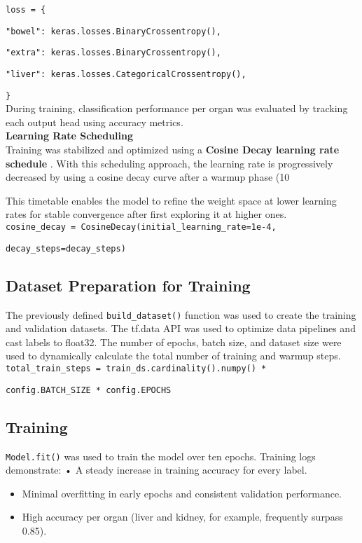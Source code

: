 \documentclass[a4paper,12pt]{article}
\begin{document}
\verb|loss = {|

\verb|"bowel": keras.losses.BinaryCrossentropy(),|

\verb|"extra": keras.losses.BinaryCrossentropy(),|

\verb|"liver": keras.losses.CategoricalCrossentropy(),|

\verb|}|
\\
During training, classification performance per organ was evaluated by tracking each output head using accuracy metrics.
\\

\textbf{Learning Rate Scheduling }
\\
Training was stabilized and optimized using a \textbf{Cosine Decay learning rate schedule} \cite{loshchilov2017sgdr}. With this scheduling approach, the learning rate is progressively decreased by using a cosine decay curve after a warmup phase (10%

This timetable enables the model to refine the weight space at lower learning rates for stable convergence after first exploring it at higher ones.
\\

\verb|cosine_decay = CosineDecay(initial_learning_rate=1e-4,|

\verb|decay_steps=decay_steps)|


\subsection{Dataset Preparation for Training}
The previously defined \verb|build_dataset()| function was used to create the training and validation datasets. The tf.data API was used to optimize data pipelines and cast labels to float32. The number of epochs, batch size, and dataset size were used to dynamically calculate the total number of training and warmup steps.
\\

\verb|total_train_steps = train_ds.cardinality().numpy() *|

\verb|config.BATCH_SIZE * config.EPOCHS|

\subsection{Training}
\verb|Model.fit()| was used to train the model over ten epochs. Training logs demonstrate: • A steady increase in training accuracy for every label.

\begin{itemize}
    \item Minimal overfitting in early epochs and consistent validation performance.
    \item High accuracy per organ (liver and kidney, for example, frequently surpass 0.85).
\end{itemize}
\end{document}
